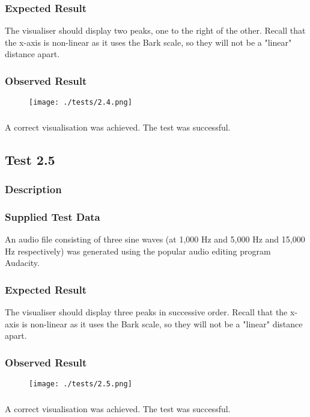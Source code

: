 \subsubsection{Expected Result}
The visualiser should display two peaks, one to the right of the other. Recall that the x-axis is non-linear as it uses the Bark scale, so they will not be a "linear" distance apart.

\subsubsection{Observed Result}
\begin{figure}[H]
	\texttt{[image: ./tests/2.4.png]}
\end{figure}

\subsubsection{}
A correct visualisation was achieved. The test was successful.


\pagebreak
\subsection{Test 2.5}
\subsubsection{Description}
\paragraph{}
{
	\centering
}

\subsubsection{Supplied Test Data}
An audio file consisting of three sine waves (at 1,000 Hz and 5,000 Hz and 15,000 Hz respectively) was generated using the popular audio editing program Audacity.

\subsubsection{Expected Result}
The visualiser should display three peaks in successive order. Recall that the x-axis is non-linear as it uses the Bark scale, so they will not be a "linear" distance apart.

\subsubsection{Observed Result}
\begin{figure}[H]
	\texttt{[image: ./tests/2.5.png]}
\end{figure}

\subsubsection{}
A correct visualisation was achieved. The test was successful.